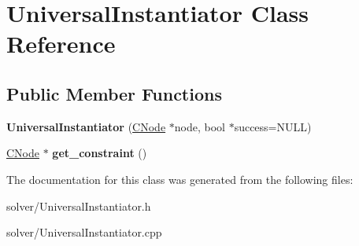 \hypertarget{classUniversalInstantiator}{\section{\-Universal\-Instantiator \-Class \-Reference}
\label{classUniversalInstantiator}
}
\subsection*{\-Public \-Member \-Functions}
\begin{DoxyCompactItemize}
\item 
\hypertarget{classUniversalInstantiator_abceb99337d55da377297b791c924774c}{{\bfseries \-Universal\-Instantiator} (\hyperlink{classCNode}{\-C\-Node} $\ast$node, bool $\ast$success=\-N\-U\-L\-L)}\label{classUniversalInstantiator_abceb99337d55da377297b791c924774c}

\item 
\hypertarget{classUniversalInstantiator_aa0fb9868d1b7fef64436134c506b6c85}{\hyperlink{classCNode}{\-C\-Node} $\ast$ {\bfseries get\-\_\-constraint} ()}\label{classUniversalInstantiator_aa0fb9868d1b7fef64436134c506b6c85}

\end{DoxyCompactItemize}


\-The documentation for this class was generated from the following files\-:\begin{DoxyCompactItemize}
\item 
solver/\-Universal\-Instantiator.\-h\item 
solver/\-Universal\-Instantiator.\-cpp\end{DoxyCompactItemize}

